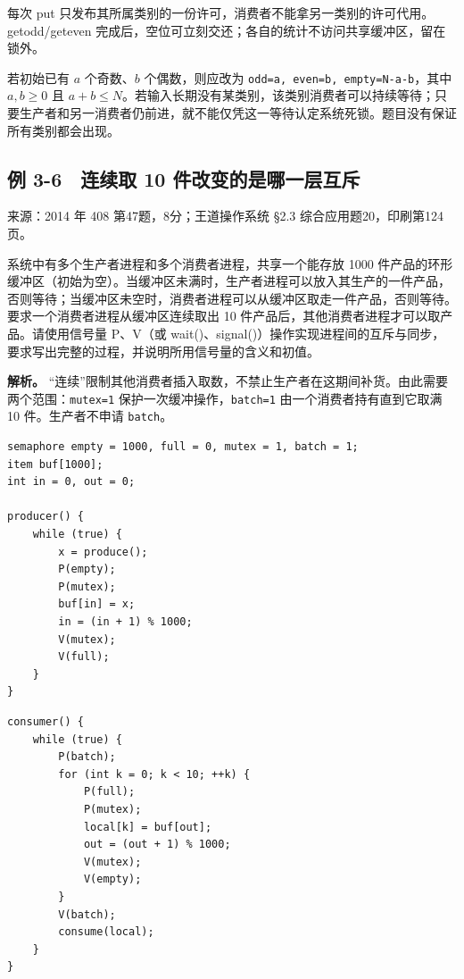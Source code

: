 每次 put 只发布其所属类别的一份许可，消费者不能拿另一类别的许可代用。getodd/geteven 完成后，空位可立刻交还；各自的统计不访问共享缓冲区，留在锁外。

若初始已有 \(a\) 个奇数、\(b\) 个偶数，则应改为 \texttt{odd=a,\ even=b,\ empty=N-a-b}，其中 \(a,b\ge0\) 且 \(a+b\le N\)。若输入长期没有某类别，该类别消费者可以持续等待；只要生产者和另一消费者仍前进，就不能仅凭这一等待认定系统死锁。题目没有保证所有类别都会出现。

\subsection{例 3-6　连续取 10 件改变的是哪一层互斥}\label{ex-2014}

来源：2014 年 408 第47题，8分；王道操作系统 §2.3 综合应用题20，印刷第124页。

系统中有多个生产者进程和多个消费者进程，共享一个能存放 1000 件产品的环形缓冲区（初始为空）。当缓冲区未满时，生产者进程可以放入其生产的一件产品，否则等待；当缓冲区未空时，消费者进程可以从缓冲区取走一件产品，否则等待。要求一个消费者进程从缓冲区连续取出 10 件产品后，其他消费者进程才可以取产品。请使用信号量 P、V（或 wait()、signal()）操作实现进程间的互斥与同步，要求写出完整的过程，并说明所用信号量的含义和初值。


\textbf{解析。} ``连续''限制其他消费者插入取数，不禁止生产者在这期间补货。由此需要两个范围：\texttt{mutex=1} 保护一次缓冲操作，\texttt{batch=1} 由一个消费者持有直到它取满 10 件。生产者不申请 \texttt{batch}。

\par\medskip\noindent\begin{minipage}{\linewidth}
\begin{verbatim}
semaphore empty = 1000, full = 0, mutex = 1, batch = 1;
item buf[1000];
int in = 0, out = 0;

producer() {
    while (true) {
        x = produce();
        P(empty);
        P(mutex);
        buf[in] = x;
        in = (in + 1) % 1000;
        V(mutex);
        V(full);
    }
}
\end{verbatim}
\end{minipage}\par\medskip

\par\medskip\noindent\begin{minipage}{\linewidth}
\begin{verbatim}
consumer() {
    while (true) {
        P(batch);
        for (int k = 0; k < 10; ++k) {
            P(full);
            P(mutex);
            local[k] = buf[out];
            out = (out + 1) % 1000;
            V(mutex);
            V(empty);
        }
        V(batch);
        consume(local);
    }
}
\end{verbatim}
\end{minipage}\par\medskip

